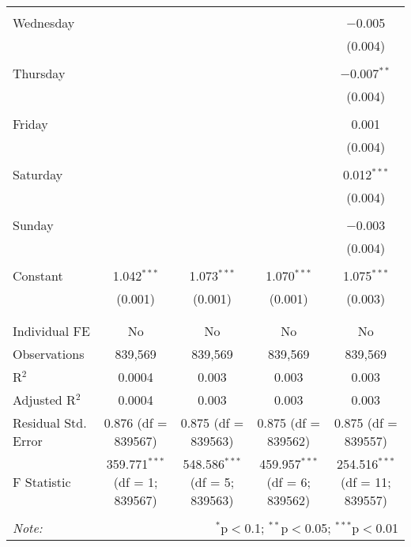 \documentclass[
]{article}
\begin{document}
\begin{table}[!htbp]
{\begin{tabular}{@{\extracolsep{5pt}}lcccc}
  & & & & \\ 
 Wednesday &  &  &  & $-$0.005 \\ 
  &  &  &  & (0.004) \\ 
  & & & & \\ 
 Thursday &  &  &  & $-$0.007$^{**}$ \\ 
  &  &  &  & (0.004) \\ 
  & & & & \\ 
 Friday &  &  &  & 0.001 \\ 
  &  &  &  & (0.004) \\ 
  & & & & \\ 
 Saturday &  &  &  & 0.012$^{***}$ \\ 
  &  &  &  & (0.004) \\ 
  & & & & \\ 
 Sunday &  &  &  & $-$0.003 \\ 
  &  &  &  & (0.004) \\ 
  & & & & \\ 
 Constant & 1.042$^{***}$ & 1.073$^{***}$ & 1.070$^{***}$ & 1.075$^{***}$ \\ 
  & (0.001) & (0.001) & (0.001) & (0.003) \\ 
  & & & & \\ 
\hline \\[-1.8ex] 
Individual FE & No & No & No & No \\ 
Observations & 839,569 & 839,569 & 839,569 & 839,569 \\ 
R$^{2}$ & 0.0004 & 0.003 & 0.003 & 0.003 \\ 
Adjusted R$^{2}$ & 0.0004 & 0.003 & 0.003 & 0.003 \\ 
Residual Std. Error & 0.876 (df = 839567) & 0.875 (df = 839563) & 0.875 (df = 839562) & 0.875 (df = 839557) \\ 
F Statistic & 359.771$^{***}$ (df = 1; 839567) & 548.586$^{***}$ (df = 5; 839563) & 459.957$^{***}$ (df = 6; 839562) & 254.516$^{***}$ (df = 11; 839557) \\ 
\hline 
\hline \\[-1.8ex] 
\textit{Note:}  & \multicolumn{4}{r}{$^{*}$p$<$0.1; $^{**}$p$<$0.05; $^{***}$p$<$0.01} \\ 
\end{tabular}
} 
\end{table} 
\newpage
\end{document}
